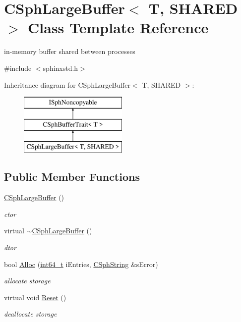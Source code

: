 \hypertarget{classCSphLargeBuffer}{\section{C\-Sph\-Large\-Buffer$<$ T, S\-H\-A\-R\-E\-D $>$ Class Template Reference}
\label{classCSphLargeBuffer}
}


in-\/memory buffer shared between processes  




{\ttfamily \#include $<$sphinxstd.\-h$>$}

Inheritance diagram for C\-Sph\-Large\-Buffer$<$ T, S\-H\-A\-R\-E\-D $>$\-:\begin{figure}[H]
\begin{center}
\leavevmode
\includegraphics[height=3.000000cm]{classCSphLargeBuffer}
\end{center}
\end{figure}
\subsection*{Public Member Functions}
\begin{DoxyCompactItemize}
\item 
\hyperlink{classCSphLargeBuffer_af69ca0ad08cf6e756deaf8f982bb07de}{C\-Sph\-Large\-Buffer} ()
\begin{DoxyCompactList}\small\item\em ctor \end{DoxyCompactList}\item 
virtual \hyperlink{classCSphLargeBuffer_a736e570766a7b623d95e5ec246705a70}{$\sim$\-C\-Sph\-Large\-Buffer} ()
\begin{DoxyCompactList}\small\item\em dtor \end{DoxyCompactList}\item 
bool \hyperlink{classCSphLargeBuffer_a5b41aceb886728fa35f07bf8c5a70f60}{Alloc} (\hyperlink{sphinxstd_8h_a996e72f71b11a5bb8b3b7b6936b1516d}{int64\-\_\-t} i\-Entries, \hyperlink{structCSphString}{C\-Sph\-String} \&s\-Error)
\begin{DoxyCompactList}\small\item\em allocate storage \end{DoxyCompactList}\item 
virtual void \hyperlink{classCSphLargeBuffer_ac53d97c812c3a7e426fdfaff94eea9dc}{Reset} ()
\begin{DoxyCompactList}\small\item\em deallocate storage \end{DoxyCompactList}\end{DoxyCompactItemize}
